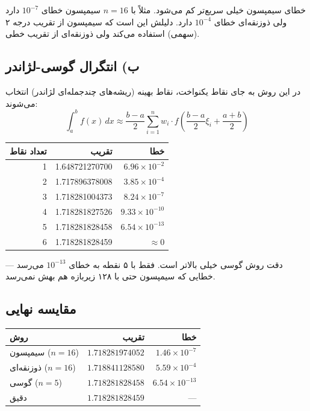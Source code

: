 \documentclass[12pt,a4paper]{article}
\begin{document}
خطای سیمپسون خیلی سریع‌تر کم می‌شود. مثلاً با $n=16$ سیمپسون خطای $10^{-7}$ دارد ولی ذوزنقه‌ای خطای $10^{-4}$ دارد. دلیلش این است که سیمپسون از تقریب درجه ۲ (سهمی) استفاده می‌کند ولی ذوزنقه‌ای از تقریب خطی.

\subsection{ب) انتگرال گوسی-لژاندر}

در این روش به جای نقاط یکنواخت، نقاط بهینه (ریشه‌های چندجمله‌ای لژاندر) انتخاب می‌شوند:
$$
\int_a^b f(x)\,dx \approx \frac{b-a}{2} \sum_{i=1}^{n} w_i \cdot f\!\left(\frac{b-a}{2}\xi_i + \frac{a+b}{2}\right)
$$

\begin{table}[H]
\centering
\begin{tabular}{rrr}
\toprule
تعداد نقاط & تقریب & خطا \\
\midrule
1 & 1.648721270700 & $6.96 \times 10^{-2}$ \\
2 & 1.717896378008 & $3.85 \times 10^{-4}$ \\
3 & 1.718281004373 & $8.24 \times 10^{-7}$ \\
4 & 1.718281827526 & $9.33 \times 10^{-10}$ \\
5 & 1.718281828458 & $6.54 \times 10^{-13}$ \\
6 & 1.718281828459 & $\approx 0$ \\
\bottomrule
\end{tabular}
\end{table}

دقت روش گوسی خیلی بالاتر است. فقط با ۵ نقطه به خطای $10^{-13}$ می‌رسد — خطایی که سیمپسون حتی با ۱۲۸ زیربازه هم بهش نمی‌رسد.

\subsection{مقایسه نهایی}

\begin{table}[H]
\centering
\begin{tabular}{lrr}
\toprule
\textbf{روش} & \textbf{تقریب} & \textbf{خطا} \\
\midrule
سیمپسون ($n=16$) & $1.718281974052$ & $1.46 \times 10^{-7}$ \\
ذوزنقه‌ای ($n=16$) & $1.718841128580$ & $5.59 \times 10^{-4}$ \\
گوسی ($n=5$) & $1.718281828458$ & $6.54 \times 10^{-13}$ \\
دقیق & $1.718281828459$ & --- \\
\bottomrule
\end{tabular}
\end{table}
\end{document}
